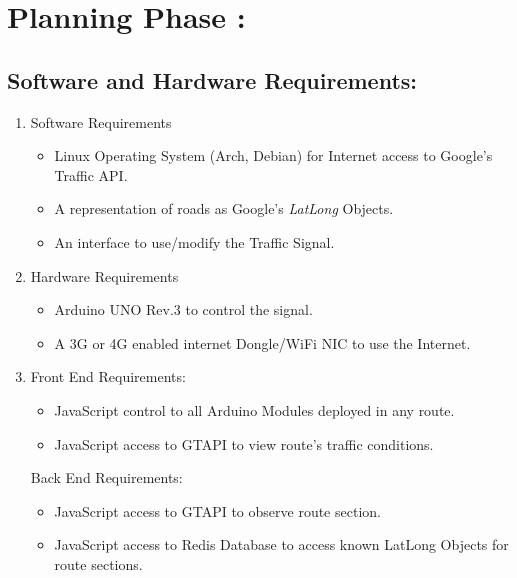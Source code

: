 \documentclass[12pt,a4paper,final]{report}
\begin{document}
\section{Planning Phase :}
\subsection{Software and Hardware Requirements:}
\begin{enumerate}
    \item 
    Software Requirements 
    \begin{itemize}
    		\item Linux Operating System (Arch, Debian) for Internet access to Google's Traffic API.
    		\item A representation of roads as Google's \emph{LatLong} Objects.
    		\item An interface to use/modify the Traffic Signal.
    \end{itemize}
    \item
    Hardware Requirements
    \begin{itemize}
    		\item Arduino UNO Rev.3 to control the signal.
    		\item A 3G or 4G enabled internet Dongle/WiFi NIC to use the Internet.
    \end{itemize}
    \item
    Front End Requirements:
    \begin{itemize}
    		\item JavaScript control to all Arduino Modules deployed in any route.
    		\item JavaScript access to GTAPI to view route's traffic conditions.
    \end{itemize}
    Back End Requirements:
    \begin{itemize}
    		\item JavaScript access to GTAPI to observe route section.
    		\item JavaScript access to Redis Database to access known LatLong Objects for route sections.
    \end{itemize}
\end{enumerate}
\end{document}

